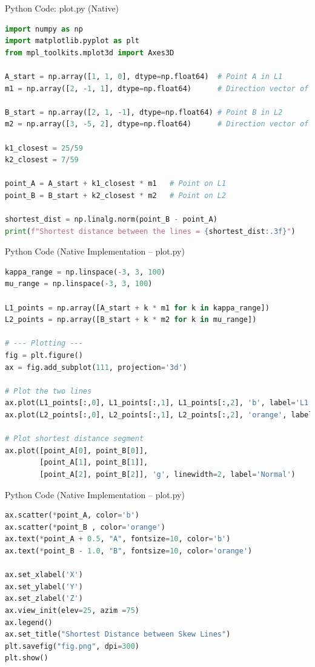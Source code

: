 \documentclass{beamer}
\begin{document}
\begin{frame}[fragile]{Python Code: plot.py (Native)}
\begin{lstlisting}[language=Python]
import numpy as np
import matplotlib.pyplot as plt
from mpl_toolkits.mplot3d import Axes3D

A_start = np.array([1, 1, 0], dtype=np.float64)  # Point A in L1
m1 = np.array([2, -1, 1], dtype=np.float64)      # Direction vector of L1

B_start = np.array([2, 1, -1], dtype=np.float64) # Point B in L2
m2 = np.array([3, -5, 2], dtype=np.float64)      # Direction vector of L2

k1_closest = 25/59
k2_closest = 7/59

point_A = A_start + k1_closest * m1   # Point on L1
point_B = B_start + k2_closest * m2   # Point on L2

shortest_dist = np.linalg.norm(point_B - point_A)
print(f"Shortest distance between the lines = {shortest_dist:.3f}")
\end{lstlisting}
\end{frame}


\begin{frame}[fragile]{Python Code (Native Implementation – plot.py)}
\begin{lstlisting}[language=Python]
kappa_range = np.linspace(-3, 3, 100)
mu_range = np.linspace(-3, 3, 100)

L1_points = np.array([A_start + k * m1 for k in kappa_range])
L2_points = np.array([B_start + k * m2 for k in mu_range])

# --- Plotting ---
fig = plt.figure()
ax = fig.add_subplot(111, projection='3d')

# Plot the two lines
ax.plot(L1_points[:,0], L1_points[:,1], L1_points[:,2], 'b', label='L1')
ax.plot(L2_points[:,0], L2_points[:,1], L2_points[:,2], 'orange', label='L2')

# Plot shortest distance segment
ax.plot([point_A[0], point_B[0]],
        [point_A[1], point_B[1]],
        [point_A[2], point_B[2]], 'g', linewidth=2, label='Normal')
\end{lstlisting}
\end{frame}

\begin{frame}[fragile]{Python Code (Native Implementation – plot.py)}
\begin{lstlisting}[language=Python]
ax.scatter(*point_A, color='b')
ax.scatter(*point_B , color='orange')
ax.text(*point_A + 0.5, "A", fontsize=10, color='b')
ax.text(*point_B - 1.0, "B", fontsize=10, color='orange')

ax.set_xlabel('X')
ax.set_ylabel('Y')
ax.set_zlabel('Z')
ax.view_init(elev=25, azim =75)
ax.legend()
ax.set_title("Shortest Distance between Skew Lines")
plt.savefig("fig.png", dpi=300)
plt.show()
\end{lstlisting}
\end{frame}
\end{document}
